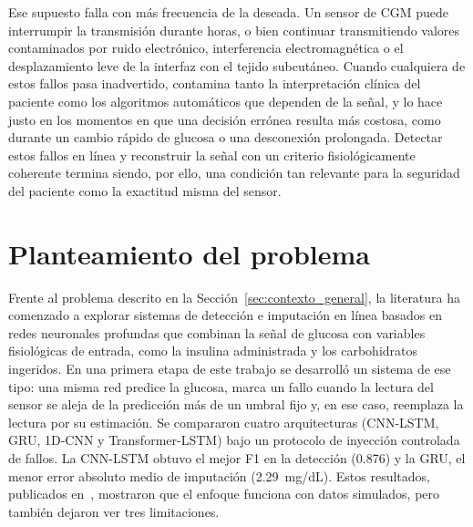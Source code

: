 \documentclass{report}
\begin{document}
Ese supuesto falla con más frecuencia de la deseada. Un sensor de CGM puede interrumpir la transmisión durante horas, o bien continuar transmitiendo valores contaminados por ruido electrónico, interferencia electromagnética o el desplazamiento leve de la interfaz con el tejido subcutáneo. Cuando cualquiera de estos fallos pasa inadvertido, contamina tanto la interpretación clínica del paciente como los algoritmos automáticos que dependen de la señal, y lo hace justo en los momentos en que una decisión errónea resulta más costosa, como durante un cambio rápido de glucosa o una desconexión prolongada. Detectar estos fallos en línea y reconstruir la señal con un criterio fisiológicamente coherente termina siendo, por ello, una condición tan relevante para la seguridad del paciente como la exactitud misma del sensor.

\section{Planteamiento del problema}
\label{sec:planteamiento_problema}

Frente al problema descrito en la Sección~\ref{sec:contexto_general}, la literatura ha comenzado a explorar sistemas de detección e imputación en línea basados en redes neuronales profundas que combinan la señal de glucosa con variables fisiológicas de entrada, como la insulina administrada y los carbohidratos ingeridos. En una primera etapa de este trabajo se desarrolló un sistema de ese tipo: una misma red predice la glucosa, marca un fallo cuando la lectura del sensor se aleja de la predicción más de un umbral fijo y, en ese caso, reemplaza la lectura por su estimación. Se compararon cuatro arquitecturas (CNN-LSTM, GRU, 1D-CNN y Transformer-LSTM) bajo un protocolo de inyección controlada de fallos. La CNN-LSTM obtuvo el mejor F1 en la detección (0.876) y la GRU, el menor error absoluto medio de imputación (2.29~mg/dL). Estos resultados, publicados en~\cite{sanchez2025imputation}, mostraron que el enfoque funciona con datos simulados, pero también dejaron ver tres limitaciones.
\end{document}
